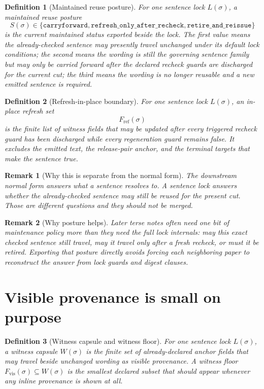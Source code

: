\documentclass[11pt]{article}
\newtheorem{definition}{Definition}
\newtheorem{remark}{Remark}
\begin{document}
\begin{definition}[Maintained reuse posture]
For one sentence lock $L(\sigma)$, a \emph{maintained reuse posture}
\[
S(\sigma)\in\{\texttt{carryforward},\texttt{refresh\_only\_after\_recheck},\texttt{retire\_and\_reissue}\}
\]
is the current maintained status exported beside the lock. The first value means the already-checked sentence may presently travel unchanged under its default lock conditions; the second means the wording is still the governing sentence family but may only be carried forward after the declared recheck guards are discharged for the current cut; the third means the wording is no longer reusable and a new emitted sentence is required.
\end{definition}

\begin{definition}[Refresh-in-place boundary]
For one sentence lock $L(\sigma)$, an \emph{in-place refresh set}
\[
F_{\mathrm{ref}}(\sigma)
\]
is the finite list of witness fields that may be updated after every triggered recheck guard has been discharged while every regeneration guard remains false.
It excludes the emitted text, the release-pair anchor, and the terminal targets that make the sentence true.
\end{definition}

\begin{remark}[Why this is separate from the normal form]
The downstream normal form answers what a sentence resolves to.
A sentence lock answers whether the already-checked sentence may still be reused for the present cut.
Those are different questions and they should not be merged.
\end{remark}

\begin{remark}[Why posture helps]
Later terse notes often need one bit of maintenance policy more than they need the full lock internals: may this exact checked sentence still travel, may it travel only after a fresh recheck, or must it be retired. Exporting that posture directly avoids forcing each neighboring paper to reconstruct the answer from lock guards and digest clauses.
\end{remark}

\section{Visible provenance is small on purpose}

\begin{definition}[Witness capsule and witness floor]
For one sentence lock $L(\sigma)$, a \emph{witness capsule} $W(\sigma)$ is the finite set of already-declared anchor fields that may travel beside unchanged wording as visible provenance.
A \emph{witness floor} $F_{\mathrm{vis}}(\sigma)\subseteq W(\sigma)$ is the smallest declared subset that should appear whenever any inline provenance is shown at all.
\end{definition}
\end{document}
